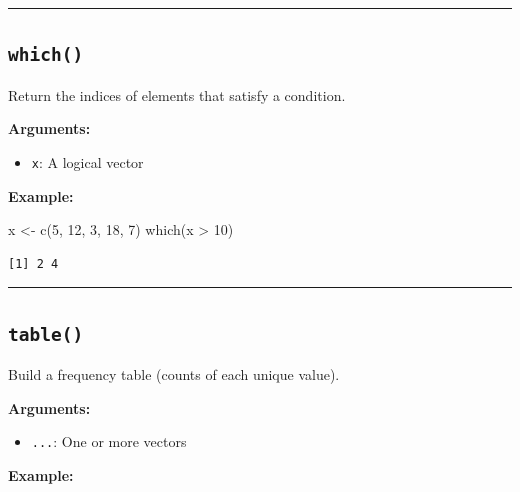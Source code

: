 \documentclass[
  letterpaper,
  DIV=11,
  numbers=noendperiod]{scrreprt}
\newenvironment{Shaded}{\begin{snugshade}}{\end{snugshade}}
\newcommand{\DecValTok}[1]{\textcolor[rgb]{0.68,0.00,0.00}{#1}}
\newcommand{\FunctionTok}[1]{\textcolor[rgb]{0.28,0.35,0.67}{#1}}
\newcommand{\NormalTok}[1]{\textcolor[rgb]{0.00,0.23,0.31}{#1}}
\newcommand{\OtherTok}[1]{\textcolor[rgb]{0.00,0.23,0.31}{#1}}
\newcommand{\SpecialCharTok}[1]{\textcolor[rgb]{0.37,0.37,0.37}{#1}}
\providecommand{\tightlist}{%
  \setlength{\itemsep}{0pt}\setlength{\parskip}{0pt}}
\begin{document}
\begin{center}\rule{0.5\linewidth}{0.5pt}\end{center}

\subsection{\texorpdfstring{\texttt{which()}}{which()}}\label{which}

Return the indices of elements that satisfy a condition.

\textbf{Arguments:}

\begin{itemize}
\tightlist
\item
  \texttt{x}: A logical vector
\end{itemize}

\textbf{Example:}

\begin{Shaded}
\begin{Highlighting}[]
\NormalTok{x }\OtherTok{\textless{}{-}} \FunctionTok{c}\NormalTok{(}\DecValTok{5}\NormalTok{, }\DecValTok{12}\NormalTok{, }\DecValTok{3}\NormalTok{, }\DecValTok{18}\NormalTok{, }\DecValTok{7}\NormalTok{)}
\FunctionTok{which}\NormalTok{(x }\SpecialCharTok{\textgreater{}} \DecValTok{10}\NormalTok{)}
\end{Highlighting}
\end{Shaded}

\begin{verbatim}
[1] 2 4
\end{verbatim}

\begin{center}\rule{0.5\linewidth}{0.5pt}\end{center}

\subsection{\texorpdfstring{\texttt{table()}}{table()}}\label{table}

Build a frequency table (counts of each unique value).

\textbf{Arguments:}

\begin{itemize}
\tightlist
\item
  \texttt{...}: One or more vectors
\end{itemize}

\textbf{Example:}

\begin{Shaded}
\end{Shaded}
\end{document}
